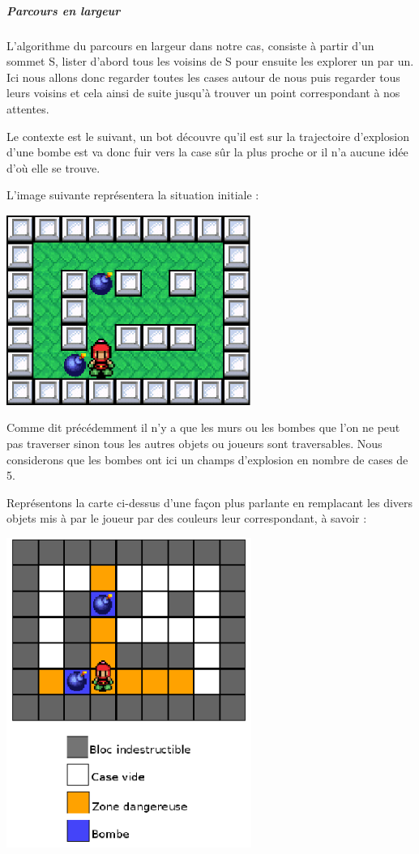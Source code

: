 		\subparagraph{Parcours en largeur\\}
		
			L'algorithme du parcours en largeur dans notre cas, consiste à partir d'un sommet S,
			lister d'abord tous les voisins de S pour ensuite les explorer un par un.
			Ici nous allons donc regarder toutes les cases autour de nous puis regarder
			tous leurs voisins et cela ainsi de suite jusqu'à trouver un point
			correspondant à nos attentes.
			
			Le contexte est le suivant, un \gls{bot} découvre qu'il est sur la trajectoire
			d'explosion d'une bombe est va donc fuir vers la case sûr la plus proche or
			il n'a aucune idée d'où elle se trouve.
			
			L'image suivante représentera la situation initiale :
			
			\begin{center}
				\includegraphics[width=8cm]{./Analyse/Img/largeur_0.eps}
			\end{center}
			
			Comme dit précédemment il n'y a que les murs ou les bombes que l'on ne peut
			pas traverser sinon tous les autres objets ou joueurs sont traversables.
			Nous considerons que les bombes ont ici un champs d'explosion en nombre de
			cases de 5.			
			
			Représentons la carte ci-dessus d'une façon plus parlante en remplacant les
			divers objets mis à par le joueur par des couleurs leur correspondant, à
			savoir :
			
			\begin{center}
				\includegraphics[width=8cm]{./Analyse/Img/largeur_1.eps}
			\end{center}
			
